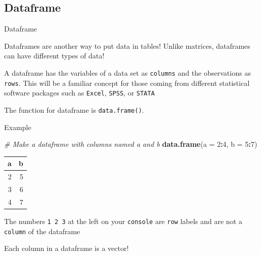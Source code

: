 \documentclass[
  ignorenonframetext,
]{beamer}
\newenvironment{Shaded}{\begin{snugshade}}{\end{snugshade}}
\newcommand{\CommentTok}[1]{\textcolor[rgb]{0.56,0.35,0.01}{\textit{#1}}}
\newcommand{\DataTypeTok}[1]{\textcolor[rgb]{0.13,0.29,0.53}{#1}}
\newcommand{\DecValTok}[1]{\textcolor[rgb]{0.00,0.00,0.81}{#1}}
\newcommand{\KeywordTok}[1]{\textcolor[rgb]{0.13,0.29,0.53}{\textbf{#1}}}
\newcommand{\NormalTok}[1]{#1}
\newcommand{\OperatorTok}[1]{\textcolor[rgb]{0.81,0.36,0.00}{\textbf{#1}}}
\begin{document}
\subsection{Dataframe}
\begin{frame}[fragile]{Dataframe}
\protect\hypertarget{dataframe}{}

Dataframes are another way to put data in tables! Unlike matrices,
dataframes can have different types of data!

A dataframe has the variables of a data set as \texttt{columns} and the
observations as \texttt{rows}. This will be a familiar concept for those
coming from different statistical software packages such as
\texttt{Excel}, \texttt{SPSS}, or \texttt{STATA}

The function for dataframe is \texttt{data.frame()}.

\end{frame}

\begin{frame}[fragile]{Example}
\protect\hypertarget{example-7}{}

\begin{Shaded}
\begin{Highlighting}[]
\CommentTok{# Make a dataframe with columns named a and b}
\KeywordTok{data.frame}\NormalTok{(}\DataTypeTok{a =} \DecValTok{2}\OperatorTok{:}\DecValTok{4}\NormalTok{, }\DataTypeTok{b =} \DecValTok{5}\OperatorTok{:}\DecValTok{7}\NormalTok{)}
\end{Highlighting}
\end{Shaded}

\begin{longtable}[]{@{}rr@{}}
\toprule
a & b\tabularnewline
\midrule
\endhead
2 & 5\tabularnewline
3 & 6\tabularnewline
4 & 7\tabularnewline
\bottomrule
\end{longtable}

The numbers \texttt{1\ 2\ 3} at the left on your \texttt{console} are
\texttt{row} labels and are not a \texttt{column} of the dataframe

Each column in a dataframe is a vector!

\end{frame}
\end{document}

